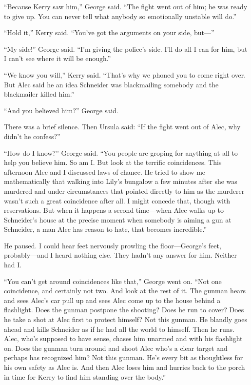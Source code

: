 \documentclass{novel}
\begin{document}
“Because Kerry saw him,” George said. “The fight went out of him; he was ready to give up. You can never tell what anybody so emotionally unstable will do.”

“Hold it,” Kerry said. “You’ve got the arguments on your side, but—”

“My side!” George said. “I’m giving the police’s side. I’ll do all I can for him, but I can’t see where it will be enough.”

“We know you will,” Kerry said. “That’s why we phoned you to come right over. But Alec said he an idea Schneider was blackmailing somebody and the blackmailer killed him.”

“And you believed him?” George said.

There was a brief silence. Then Ursula said: “If the fight went out of Alec, why didn’t he confess?”

“How do I know?” George said. “You people are groping for anything at all to help you believe him. So am I. But look at the terrific coincidences. This afternoon Alec and I discussed laws of chance. He tried to show me mathematically that walking into Lily’s bungalow a few \mbox{minutes} after she was murdered and under circumstances that pointed directly to him as the murderer wasn’t such a great coincidence after all. I might concede that, though with reservations. But when it happens a second time—when Alec walks up to Schneider’s house at the precise moment when somebody is aiming a gun at Schneider, a man Alec has reason to hate, that becomes incredible.”

He paused. I could hear feet nervously prowling the floor—George’s feet, probably—and I heard nothing else. They hadn’t any answer for him. Neither had I.

“You can’t get around coincidences like that,” George went on. “Not one coincidence, and certainly not two. And look at the rest of it. The gunman hears and sees Alec’s car pull up and sees Alec come up to the house behind a flashlight. Does the gunman postpone the shooting? Does he run to cover? Does he take a shot at Alec first to protect himself? Not this gunman. He blandly goes ahead and kills Schneider as if he had all the world to himself. Then he runs. Alec, who’s supposed to have sense, chases him unarmed and with his flashlight on. Does the gunman turn around and shoot Alec who’s a clear target and perhaps has recognized him? Not this gunman. He’s every bit as thoughtless for his own safety as Alec is. And then Alec loses him and hurries back to the porch in time for Kerry to find him standing over the body.”
\end{document}
